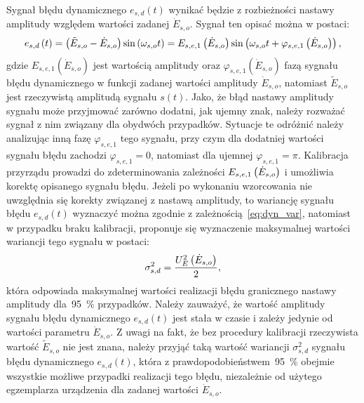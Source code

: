 Sygnał błędu dynamicznego $e_{s,d}(t)$ wynikać będzie z rozbieżności nastawy amplitudy względem wartości zadanej $\dot{E}_{s,o}$. Sygnał ten opisać można w postaci:
\begin{equation}
e_{s,d} \left(t\right) = \left(\tilde{E}_{s,o} - \dot{E}_{s,o}\right) \sin \left(\omega_{s,o} t\right) = E_{s,e,1} \left(\dot{E}_{s,o}\right) \sin \left(\omega_{s,o} t + \varphi_{s,e,1} \left(\dot{E}_{s,o}\right)\right) \label{eq:pom_gen_err_dyn_mono},
\end{equation}
gdzie $E_{s,e,1}(\dot{E}_{s,o})$ jest wartością amplitudy oraz $\varphi_{s,e,1}(\dot{E}_{s,o})$ fazą sygnału błędu dynamicznego w funkcji zadanej wartości amplitudy $\dot{E}_{s,o}$, natomiast $\tilde{E}_{s,o}$ jest rzeczywistą amplitudą sygnału $s(t)$. Jako, że błąd nastawy amplitudy sygnału może przyjmować zarówno dodatni, jak ujemny znak, należy rozważać sygnał z nim związany dla obydwóch przypadków. Sytuacje te odróżnić należy analizując inną fazę $\varphi_{s,e,1}$ tego sygnału, przy czym dla dodatniej wartości sygnału błędu zachodzi $\varphi_{s,e,1} = 0$, natomiast dla ujemnej $\varphi_{s,e,1} = \pi$. Kalibracja przyrządu prowadzi do zdeterminowania zależności $E_{s,e,1} \left(\dot{E}_{s,o}\right)$ i umożliwia korektę opisanego sygnału błędu. Jeżeli po wykonaniu wzorcowania nie uwzględnia się korekty związanej z nastawą amplitudy, to wariancję sygnału błędu $e_{s,d}(t)$ wyznaczyć można zgodnie z zależnością~\eqref{eq:dyn_var}, natomiast w przypadku braku kalibracji, proponuje się wyznaczenie maksymalnej wartości wariancji tego sygnału w postaci:
\begin{equation}
\sigma_{s,d}^{2} = \frac{U_{E}^{2} \left(\dot{E}_{s,o}\right)}{2} \label{eq:pom_gen_var_dyn},
\end{equation}
która odpowiada maksymalnej wartości realizacji błędu granicznego nastawy amplitudy dla~\qty{95}{\percent} przypadków. Należy zauważyć, że wartość amplitudy sygnału błędu dynamicznego $e_{s,d}(t)$ jest stała w czasie i zależy jedynie od wartości parametru $\dot{E}_{s,o}$. Z uwagi na fakt, że bez procedury kalibracji rzeczywista wartość $\tilde{E}_{s,o}$ nie jest znana, należy przyjąć taką wartość wariancji $\sigma_{s,d}^{2}$ sygnału błędu dynamicznego $e_{s,d}(t)$, która z prawdopodobieństwem~\qty{95}{\percent} obejmie wszystkie możliwe przypadki realizacji tego błędu, niezależnie od użytego egzemplarza urządzenia dla zadanej wartości $\dot{E}_{s,o}$.

